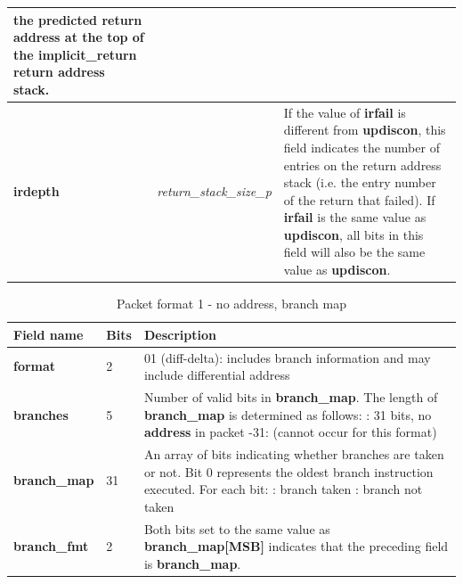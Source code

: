 \begin{table}[htp]
\begin{tabulary}{\textwidth}{|l|p{35mm}|p{90mm}|}
                the predicted return address at the top of the implicit\_return return address stack.\\
    \hline
    \textbf{irdepth}	& \textit {return\_stack\_size\_p} & 
                If the value of \textbf{irfail} is different from \textbf{updiscon}, this field indicates 
                the number of entries on the return address stack (i.e. the entry number of the return that
                failed).  If \textbf{irfail} is the same value as \textbf{updiscon}, all bits in this field 
                will also be the same value as \textbf{updiscon}. \\
    \hline
  \end{tabulary}
\end{table}

\begin{table}[htp]
  \centering
  \caption{Packet format 1  - no address, branch map}
  \label{tab:te_inst0-1-noaddr-map}
  \begin{tabulary}{\textwidth}{|l|p{35mm}|p{90mm}|}
    \hline
    {\bf Field name} & {\bf Bits} & {\bf Description} \\
    \hline
    \textbf{format}	& 2	& 01 (diff-delta): includes branch information and may include differential address\\
    \hline
    \textbf{branches} & 5 & Number of valid bits in \textbf{branch\_map}. The length of \textbf{branch\_map} is determined as follows: :    31 bits, no \textbf{address} in packet -31: (cannot occur for this format) \\
    \hline
    \textbf{branch\_map} & 31 & 
                 An array of bits indicating whether branches are taken or not.\newline
    Bit 0 represents the oldest branch instruction executed.   For each bit: : branch taken : branch not taken \\
    \hline
    \textbf{branch\_fmt} & 2  & Both bits set to the same value as \textbf{branch\_map[MSB]} indicates that the
    preceding field is \textbf{branch\_map}. \\
    \hline
  \end{tabulary}
\end{table}


